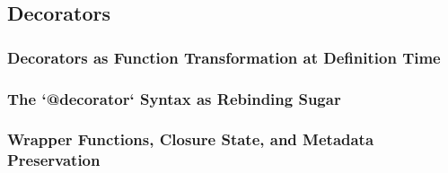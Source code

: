 \subsection{Decorators}
\subsubsection{Decorators as Function Transformation at Definition Time}
\subsubsection{The `@decorator` Syntax as Rebinding Sugar}
\subsubsection{Wrapper Functions, Closure State, and Metadata Preservation}
